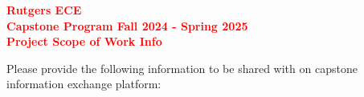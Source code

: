 \documentclass{article}
\begin{document}
\begin{center}
    \textcolor{red}{\textbf{\Large Rutgers ECE}} \\

    \vspace{1em}
    \textcolor{red}{\textbf{\Large Capstone Program Fall 2024 - Spring 2025}} \\

    \vspace{1em}
    \textcolor{red}{\textbf{\Large Project Scope of Work Info}} \\
\end{center}

\vspace{1em}
\noindent Please provide the following information to be shared with on capstone information exchange platform:
\end{document}
